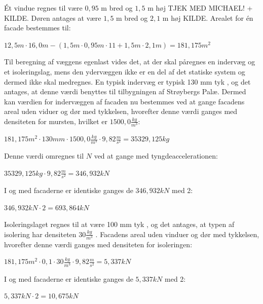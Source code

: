\indent{     }  Ét vindue regnes til være $0,\!95$ m bred og $1,\!5$ m høj TJEK MED MICHAEL! + KILDE. Døren antages at være $1,\!5$ m bred og $2,\!1$ m høj KILDE. Arealet for én facade bestemmes til:
\begin{center}
	$12,\!5 m\cdot 16,\!0 m - (1,\!5 m\cdot0,\!95 m\cdot11 + 1,\!5 m\cdot 2,\!1 m)=181,\!175 m^2$
\end{center}

Til beregning af væggens egenlast vides det, at der skal påregnes en indervæg og et isoleringslag, mens den ydervæggen ikke er en del af det statiske system og dermed ikke skal medregnes.
\newline \indent{     }  En typisk indervæg er typisk 130 mm tyk \citep{indervaeg}, og det antages, at denne værdi benyttes til tilbygningen af Strøybergs Palæ. Dermed kan værdien for indervæggen af facaden nu bestemmes ved at gange facadens areal uden viduer og dør med tykkelsen, hvorefter denne værdi ganges med densiteten for mursten, hvilket er $1500,\!0 \frac{kg}{m^3}$:
\begin{center}
	$181,\!175 m^2\cdot 130 mm\cdot 1500,\!0 \frac{kg}{m^3}\cdot 9,\!82 \frac{m}{s^2}=35329,\!125 kg$
\end{center}

Denne værdi omregnes til $N$ ved at gange med tyngdeaccelerationen:
\begin{center}
	$35329,\!125 kg\cdot 9,\!82 \frac{m}{s^2}=346,\!932 kN$
\end{center}

I og med facaderne er identiske ganges de $346,\!932 kN$ med 2:
\begin{center}
	$346,\!932 kN\cdot 2=693,\!864 kN$
\end{center}

Isoleringslaget regnes til at være 100 mm tyk \citep{isolering}, og det antages, at typen af isolering har densiteten $30 \frac{kg}{m^3}$ \citep{densitet}.
\newline \indent{     }  Facadens areal uden vinduer og dør med tykkelsen, hvorefter denne værdi ganges med densiteten for isoleringen:
\begin{center}
	$181,\!175 m^2\cdot 0,1 \cdot 30 \frac{kg}{m^3}\cdot 9,\!82 \frac{m}{s^2}=5,\!337 kN$
\end{center}

I og med facaderne er identiske ganges de $5,\!337 kN$ med 2:
\begin{center}
	$5,\!337 kN\cdot 2=10,\!675 kN$
\end{center}

